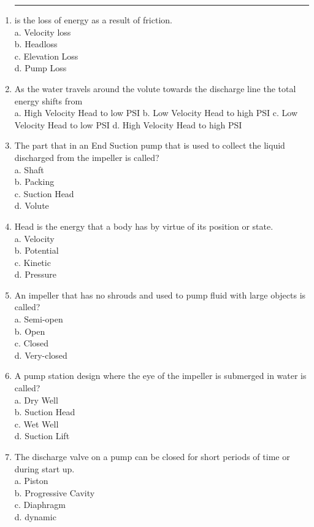 \documentclass{article}
\begin{document}
\begin{enumerate}[1.]
\item \rule{9mm}{0.5pt} is the loss of energy as a result of friction.\\
a.	Velocity loss\\
b.	Headloss\\
c.	Elevation Loss\\
d.	Pump Loss
 
\item As the water travels around the volute towards the discharge line the total energy
shifts from\\
a.	High Velocity Head to low PSI
b.	Low Velocity Head to high PSI
c.	Low Velocity Head to low PSI 
d.	High Velocity Head to high PSI

\item The part that in an End Suction pump that is used to collect the liquid discharged from the impeller is called?\\
a.	Shaft\\
b.	Packing\\
c.	Suction Head\\
d.	Volute\\

\item Head is the energy that a body has by virtue of its position or state.\\
a.	Velocity\\
b.	Potential\\
c.	Kinetic\\
d.	Pressure


\item An impeller that has no shrouds and used to pump fluid with large objects is called?\\
a.	Semi-open\\
b.	Open\\
c.	Closed\\
d.	Very-closed
 
\item A pump station design where the eye of the impeller is submerged in water is called?\\
a.	Dry Well\\
b.	Suction Head\\
c.	Wet Well\\
d.	Suction Lift


\item The discharge valve on a 	pump can be closed for short periods of time or during start up.\\
a.	Piston\\
b.	Progressive Cavity\\
c.	Diaphragm\\
d.	dynamic


\end{enumerate}
\end{document}
